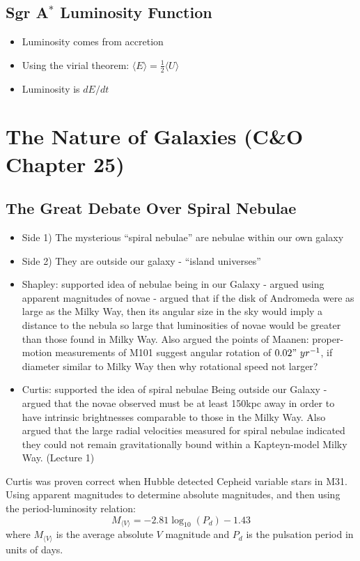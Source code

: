 \documentclass{book}
\begin{document}
\subsection{Sgr A$^*$ Luminosity Function}
\begin{itemize}
    \item Luminosity comes from accretion
    \item Using the virial theorem: $\langle E \rangle = \frac{1}{2} \langle U \rangle$
    \item Luminosity is $dE/dt$
\end{itemize}
\section{The Nature of Galaxies (C\&O Chapter 25)}
\subsection{The Great Debate Over Spiral Nebulae}
\begin{itemize}
    \item Side 1) The mysterious “spiral nebulae” are nebulae within our own galaxy
    \item Side 2) They are outside our galaxy - ``island universes''
    \item Shapley: supported idea of nebulae being in our Galaxy - argued using apparent magnitudes of novae - argued that if the disk of Andromeda were as large as the Milky Way, then its angular size in the sky would imply a distance to the nebula so large that luminosities of novae would be greater than those found in Milky Way. Also argued the points of Maanen: proper-motion measurements of M101 suggest angular rotation of $0.02"\ yr^{-1}$, if diameter similar to Milky Way then why rotational speed not larger?
    \item Curtis: supported the idea of spiral nebulae Being outside our Galaxy - argued that the novae observed must be at least 150kpc away in order to have intrinsic brightnesses comparable to those in the Milky Way. Also argued that the large radial velocities measured for spiral nebulae indicated they could not remain gravitationally bound within a Kapteyn-model Milky Way. (Lecture 1)
\end{itemize}
Curtis was proven correct when Hubble detected Cepheid variable stars in M31. Using apparent magnitudes to determine absolute magnitudes, and then using the period-luminosity relation:
\begin{equation*}
    M_{\langle V \rangle} = -2.81 \log_{10}(P_d) - 1.43 \tag{C\&O 14.1}
\end{equation*}
where $M_{\langle V \rangle}$ is the average absolute $V$ magnitude and $P_d$ is the pulsation period in units of days.
\end{document}
